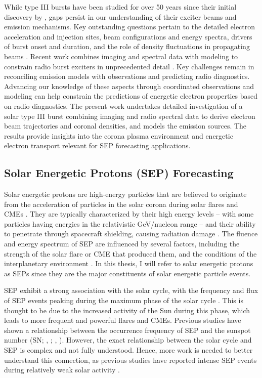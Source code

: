 While type III bursts have been studied for over 50 years since their initial discovery by \citet{wild_1950a, wild_1950b, wild_1950c}, gaps persist in our understanding of their exciter beams and emission mechanisms. Key outstanding questions pertain to the detailed electron acceleration and injection sites, beam configurations and energy spectra, drivers of burst onset and duration, and the role of density fluctuations in propagating beams \citep{reid_2018a, reid_2018b, li_2012a}. Recent work combines imaging and spectral data with modeling to constrain radio burst exciters in unprecedented detail \citep{chen_2013b, kontar_2017}. Key challenges remain in reconciling emission models with observations and predicting radio diagnostics. Advancing our knowledge of these aspects through coordinated observations and modeling can help constrain the predictions of energetic electron properties based on radio diagnostics. The present work undertakes detailed investigation of a solar type III burst combining imaging and radio spectral data to derive electron beam trajectories and coronal densities, and models the emission sources. The results provide insights into the corona plasma environment and energetic electron transport relevant for SEP forecasting applications.

\subsection{Solar Energetic Protons (SEP) Forecasting}
Solar energetic protons are high-energy particles that are believed to originate from the acceleration of particles in the solar corona during solar flares and CMEs \citep{aschwanden_2002, lin_2005, lin_2011, klein_2017, kahler_2017}. They are typically characterized by their high energy levels -- with some particles having energies in the relativistic GeV/nucleon range -- and their ability to penetrate through spacecraft shielding, causing radiation damage \citep{reames_2013, desai_2016}. The fluence and energy spectrum of SEP are influenced by several factors, including the strength of the solar flare or CME that produced them, and the conditions of the interplanetary environment \citep{kahler_1984, kahler_1987, debrunner_1988, miteva_2013, trottet_2015, dierckxsens_2015, le_2017, gopalswamy_2017}. In this thesis, I will refer to solar energetic protons as SEPs since they are the major constituents of solar energetic particle events.

SEP exhibit a strong association with the solar cycle, with the frequency and flux of SEP events peaking during the maximum phase of the solar cycle \citep{reames_2013}. This is thought to be due to the increased activity of the Sun during this phase, which leads to more frequent and powerful flares and CMEs. Previous studies have shown a relationship between the occurrence frequency of SEP and the sunspot number (SN; \citeauthor{nymmik_2007}, \citeyear{nymmik_2007}; \citeauthor{richardson_2016}, \citeyear{richardson_2016}). However, the exact relationship between the solar cycle and SEP is complex and not fully understood. Hence, more work is needed to better understand this connection, as previous studies have reported intense SEP events during relatively weak solar activity \citep{cohen_2018, ramstad_2018}.

